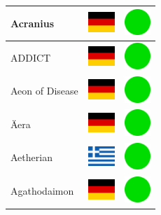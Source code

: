 \documentclass[12pt, a4paper, twoside]{report}
\begin{document}
\begin{center}
\begin{longtable}{|p{5cm}|p{2cm}|p{2cm}|}
Acranius & \includegraphics[width=1cm]{4x3/de} & \includegraphics[width=1cm]{likes/y} \\ \hline
ADDICT & \includegraphics[width=1cm]{4x3/de} & \includegraphics[width=1cm]{likes/y} \\ \hline
Aeon of Disease & \includegraphics[width=1cm]{4x3/de} & \includegraphics[width=1cm]{likes/y} \\ \hline
Äera & \includegraphics[width=1cm]{4x3/de} & \includegraphics[width=1cm]{likes/y} \\ \hline
Aetherian & \includegraphics[width=1cm]{4x3/gr} & \includegraphics[width=1cm]{likes/y} \\ \hline
Agathodaimon & \includegraphics[width=1cm]{4x3/de} & \includegraphics[width=1cm]{likes/y} \\ \hline

\end{longtable}
\end{center}
\end{document}
